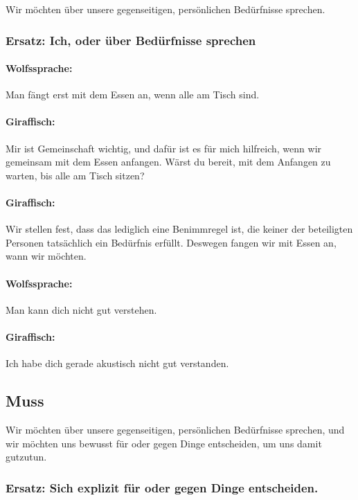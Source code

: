 Wir möchten über unsere gegenseitigen, persönlichen Bedürfnisse sprechen.

\subsubsection{Ersatz: Ich, oder über Bedürfnisse sprechen}

\paragraph{Wolfssprache:} Man fängt erst mit dem Essen an, wenn alle am Tisch sind.

\paragraph{Giraffisch:} Mir ist Gemeinschaft wichtig, und dafür ist es für mich hilfreich, wenn wir gemeinsam mit dem Essen anfangen. Wärst du bereit, mit dem Anfangen zu warten, bis alle am Tisch sitzen?

\paragraph{Giraffisch:} Wir stellen fest, dass das lediglich eine Benimmregel ist, die keiner der beteiligten Personen tatsächlich ein Bedürfnis erfüllt. Deswegen fangen wir mit Essen an, wann wir möchten.

\paragraph{Wolfssprache:} Man kann dich nicht gut verstehen.

\paragraph{Giraffisch:} Ich habe dich gerade akustisch nicht gut verstanden.

\subsection{Muss}

Wir möchten über unsere gegenseitigen, persönlichen Bedürfnisse sprechen, und wir möchten uns bewusst für oder gegen Dinge entscheiden, um uns damit gutzutun.

\subsubsection{Ersatz: Sich explizit für oder gegen Dinge entscheiden.}

